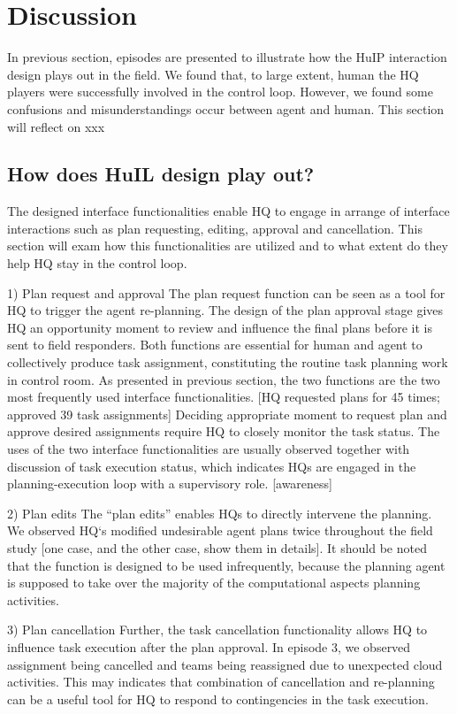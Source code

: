 \section{Discussion}

In previous section, episodes are presented to illustrate how the HuIP interaction design plays out in the field.  We found that, to large extent, human the HQ players were successfully involved in the control loop. However, we found some confusions and misunderstandings occur between agent and human. This section will reflect on xxx \\

\subsection{How does HuIL design play out?}
The designed interface functionalities enable HQ to engage in arrange of interface interactions such as plan requesting, editing, approval and cancellation. This section will exam how this functionalities are utilized and to what extent do they help HQ stay in the control loop. 

1) Plan request and approval 
The plan request function can be seen as a tool for HQ to trigger the agent re-planning. The design of the plan approval stage gives HQ an opportunity moment to review and influence the final plans before it is sent to field responders. Both functions are essential for human and agent to collectively produce task assignment, constituting the routine task planning work in control room. As presented in previous section, the two functions are the two most frequently used interface functionalities. [HQ requested plans for 45 times; approved 39 task assignments] Deciding appropriate moment to request plan and approve desired assignments require HQ to closely monitor the task status. The uses of the two interface functionalities are usually observed together with discussion of task execution status, which indicates HQs are engaged in the planning-execution loop with a supervisory role. [awareness]

2) Plan edits 
The ``plan edits'' enables HQs to directly intervene the planning. We observed HQ`s modified undesirable agent plans twice throughout the field study [one case, and the other case, show them in details]. It should be noted that the function is designed to be used infrequently, because the planning agent is supposed to take over the majority of the computational aspects 
planning activities. 

3) Plan cancellation 
Further, the task cancellation functionality allows HQ to influence task execution after the plan approval. In episode 3, we observed assignment being cancelled and teams being reassigned due to unexpected cloud activities. This may indicates that combination of cancellation and re-planning can be a useful tool for HQ to respond to contingencies in the task execution.

